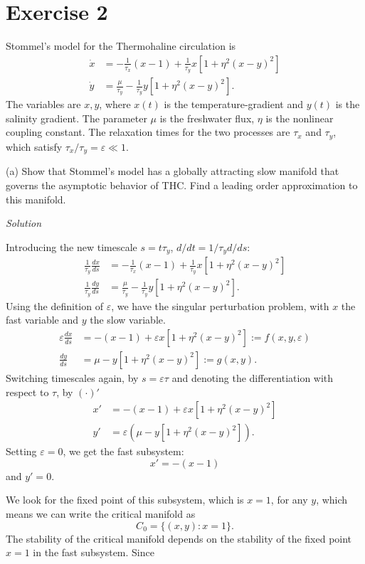 \documentclass[a4paper,11pt,pdftex]{article}
\begin{document}
\section*{Exercise 2}
Stommel's model for the Thermohaline circulation is 
\begin{align}
   \label{eqstomm}
    \dot{x} &= -\frac{1}{\tau_x}(x-1) + \frac{1}{\tau_y}x[1+\eta^2(x-y)^2] \\
    \dot{y} & = \frac{\mu}{\tau_y} - \frac{1}{\tau_y}y[1+\eta^2(x-y)^2].
\end{align}
The variables are $x,y$, where $x(t)$ is the temperature-gradient and $y(t)$ is the salinity gradient. The parameter $\mu$ is the freshwater flux, $\eta$ is the nonlinear coupling constant. The relaxation times for the two processes are $\tau_x$ and $\tau_y$, which satisfy $\tau_x/\tau_y = \varepsilon \ll 1$.

(a) Show that Stommel's model has a globally attracting slow manifold that governs the asymptotic behavior of THC. Find a leading order approximation to this manifold. 

\emph{Solution}

Introducing the new timescale $s=t\tau_y$, $d/dt = 1/\tau_y d/ds$:
\begin{align*}
    \frac{1}{\tau_y}\frac{dx}{ds} &= -\frac{1}{\tau_x}(x-1) + \frac{1}{\tau_y}x[1+\eta^2(x-y)^2] \\
    \frac{1}{\tau_y}\frac{dy}{ds} & = \frac{\mu}{\tau_y} - \frac{1}{\tau_y}y[1+\eta^2(x-y)^2].
\end{align*}
Using the definition of $\varepsilon$, we have the singular perturbation problem, with $x$ the fast variable and $y$ the slow variable. 
\begin{align}
\label{eqfast1}
    \varepsilon\frac{dx}{ds} &= -(x-1) + \varepsilon x[1+\eta^2(x-y)^2]:=f(x,y,\varepsilon) \\
    \label{eqfast2}
    \frac{dy}{ds} & = \mu - y[1+\eta^2(x-y)^2] :=g(x,y).
\end{align}
Switching timescales again, by $s=\varepsilon \tau$ and denoting the differentiation with respect to $\tau$, by $(\cdot)'$ 
\begin{align*}
    x' &= -(x-1) + \varepsilon x[1+\eta^2(x-y)^2] \\
    y' & = \varepsilon\left(\mu - y[1+\eta^2(x-y)^2]\right).
\end{align*}
Setting $\varepsilon = 0$, we get the fast subsystem:
$$
x' = -(x-1) 
$$
and $y' = 0$.

We look for the fixed point of this subsystem, which is $x=1$, for any $y$, which means we can write the critical manifold as
\begin{equation}
    C_0 = \{ (x,y): x = 1\}. 
\end{equation}
The stability of the critical manifold depends on the stability of the fixed point $x=1$ in the fast subsystem. Since 
\end{document}
